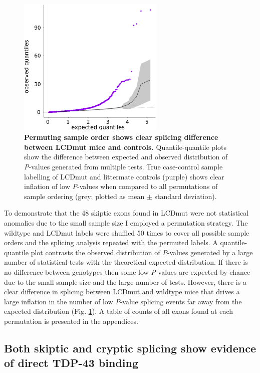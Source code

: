 \begin{figure}[h!]
	\centering
	\includegraphics[width=7cm]{Figures/05_tdp_mice/permutation_ribbon.png}
	\caption[Permuting sample order shows clear splicing difference between LCDmut mice and controls]{
		\textbf{Permuting sample order shows clear splicing difference between LCDmut mice and controls.}
		Quantile-quantile plots show the difference between expected and observed distribution of \textit{P}-values generated from multiple tests. True case-control sample labelling of LCDmut and littermate controls (purple) shows clear inflation of low \textit{P}-values when compared to all permutations of sample ordering (grey; plotted as mean $\pm$ standard deviation).
	}
	\label{fig:permutation}
\end{figure}

To demonstrate that the 48 skiptic exons found in LCDmut were not statistical anomalies due to the small sample size I employed a permutation strategy.
 The wildtype and LCDmut labels were shuffled 50 times to cover all possible sample orders and the splicing analysis repeated with the permuted labels. 
A quantile-quantile plot contrasts the observed distribution of \textit{P}-values generated by a large number of statistical tests with the theoretical expected distribution. 
If there is no difference between genotypes then some low \textit{P}-values are expected by chance due to the small sample size and the large number of tests. 
However, there is a clear difference in splicing between LCDmut and wildtype mice that drives a large inflation in the number of low \textit{P}-value splicing events far away from the expected distribution (Fig. \ref{fig:permutation}).
A table of counts of all exons found at each permutation is presented in the appendices.   


\subsection{Both skiptic and cryptic splicing show evidence of direct TDP-43 binding}

